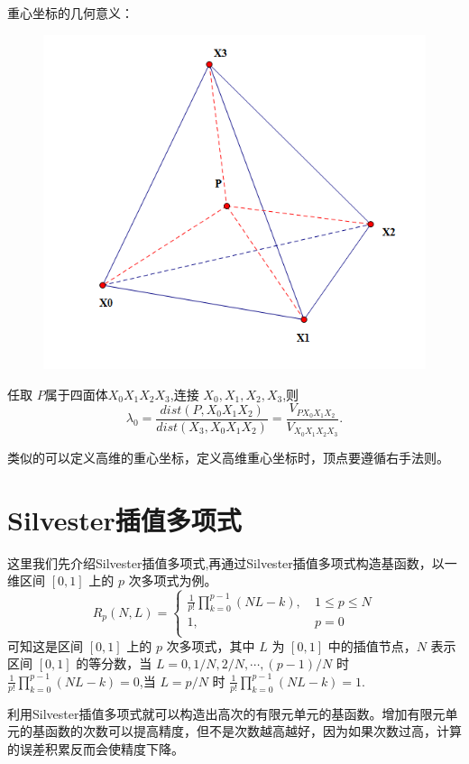 \documentclass[12pt,a4paper]{article}
\begin{document}
重心坐标的几何意义：
\begin{figure}[H]
\centering
\includegraphics[scale=0.7]{./figures/8.png}
\caption{}
\end{figure}

任取 $P$属于四面体$X_0 X_1 X_2 X_3$,连接 $X_0 ,X_1 ,X_2 ,X_3$,则
$$
\lambda _0=\frac {dist(P,X_0 X_1 X_2)}{dist(X_3,X_0 X_1 X_2)}=\frac{V_{P X_0 X_1 X_2}}{V_{X_0 X_1 X_2 X_3}}.
$$

类似的可以定义高维的重心坐标，定义高维重心坐标时，顶点要遵循右手法则。

\section{Silvester插值多项式}
这里我们先介绍Silvester插值多项式,再通过Silvester插值多项式构造基函数，以一维区间 $[0,1]$ 上的 $p$ 次多项式为例。
$$
R_p (N,L)=\begin{cases}
\frac{1}{p!}\prod_{k=0}^{p-1} (NL-k),~& 1\leqslant p\leqslant N\\
1,& p=0\\
\end{cases}
$$
可知这是区间 $[0,1]$ 上的 $p$ 次多项式，其中 $L$ 为 $[0,1]$ 中的插值节点，$N$ 表示区间 $[0,1]$ 的等分数，当 $L=0,1/N,2/N,\cdots ,(p-1)/N$ 时 $\frac{1}{p!}\prod_{k=0}^{p-1} (NL-k) =0$,当 $L=p/N$ 时 $\frac{1}{p!}\prod_{k=0}^{p-1} (NL-k) =1.$

利用Silvester插值多项式就可以构造出高次的有限元单元的基函数。增加有限元单元的基函数的次数可以提高精度，但不是次数越高越好，因为如果次数过高，计算的误差积累反而会使精度下降。
\end{document}
